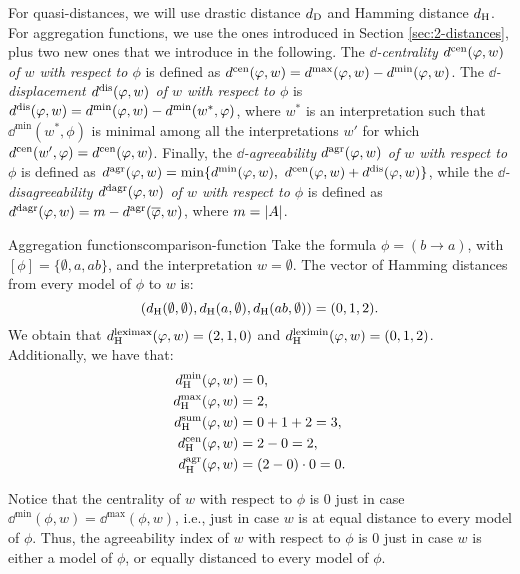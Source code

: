 For quasi-distances, we will use drastic distance $d_{\operatorname{D}}$ and Hamming distance $d_{\operatorname{H}}$.
For aggregation functions, we use the ones introduced in Section \ref{sec:2-distances}, 
plus two new ones that we introduce in the following.
The \textit{$\dd$-centrality $d^{\mathrm{cen}}(\varphi,w)$ of $w$ with respect to $\phi$}
is defined as $d^{\mathrm{cen}}(\varphi, w)=d^{\operatorname{max}}(\varphi,w)-d^{\operatorname{min}}(\varphi, w)$.
The \emph{$\dd$-displacement $d^{\mathrm{dis}}(\varphi,w)$ of $w$ with respect to $\phi$}
is $d^{\mathrm{dis}}(\varphi,w)=d^{\operatorname{min}}(\varphi,w)-d^{\operatorname{min}}(w^\ast,\varphi)$,
where $w^\ast$ is an interpretation
such that $\dd^\min(w^\ast,\phi)$ is minimal among all
the interpretations $w'$ for which $d^{\mathrm{cen}}(w',\varphi)=d^{\mathrm{cen}}(\varphi,w)$.
Finally, 
the \textit{$\dd$-agreeability $d^{\mathrm{agr}}(\varphi,w)$ of $w$ with respect to $\phi$} is  
defined as
$d^{\mathrm{agr}}(\varphi,w)={\operatorname{min}}\{d^{\operatorname{min}}(\varphi,w),~d^{\mathrm{cen}}(\varphi,w)+d^{\mathrm{dis}}(\varphi,w)\}$,
while the \textit{$\dd$-disagreeability $d^{\mathrm{dagr}}(\varphi,w)$ of $w$ with respect to $\phi$}
is defined as 
$d^{\mathrm{dagr}}(\varphi,w)=m-d^{\mathrm{agr}}(\overline{\varphi},w)$, where $m=|A|$.

\begin{xmpl}{Aggregation functions}{comparison-function}
	Take the formula $\phi=(b\rightarrow a)$, with 
	$[\phi]=\{\emptyset,a,ab\}$,
	and the interpretation $w=\emptyset$.
	The vector of Hamming distances from every model of $\phi$ to $w$ is:	
	$$
		(d_{\operatorname{H}}(\emptyset,\emptyset), d_{\operatorname{H}}(a,\emptyset),d_{\operatorname{H}}(ab,\emptyset)) = (0,1,2).
	$$
	We obtain that 
	$d_{\operatorname{H}}^{\operatorname{leximax}}(\varphi,w)=(2,1,0)$
	and 
	$d_{\operatorname{H}}^{\operatorname{leximin}}(\varphi,w)=(0,1,2)$.
	Additionally, we have that:
	\begin{align*}
		d^{\operatorname{min}}_{\operatorname{H}}(\varphi,w)   & = 0,\\
		d^{\operatorname{max}}_{\operatorname{H}}(\varphi,w)   & = 2,\\
		d^{\operatorname{sum}}_{\operatorname{H}}(\varphi, w) & = 0+1+2 = 3,\\
		d^{\mathrm{cen}}_{\operatorname{H}}(\varphi,w)   & = 2-0 = 2,\\
		d^{\mathrm{agr}}_{\operatorname{H}}(\varphi, w)  & = (2-0) \cdot 0 = 0.
	\end{align*}
\end{xmpl}

Notice that the centrality of $w$ with respect to $\phi$ is $0$	
just in case $\dd^\min(\phi,w)=\dd^\max(\phi,w)$,
i.e., just in case $w$ is at equal distance to every model of $\phi$.
Thus, the agreeability index of $w$ with respect to $\phi$ is $0$
just in case $w$ is either a model of $\phi$,
or equally distanced to every model of $\phi$.

